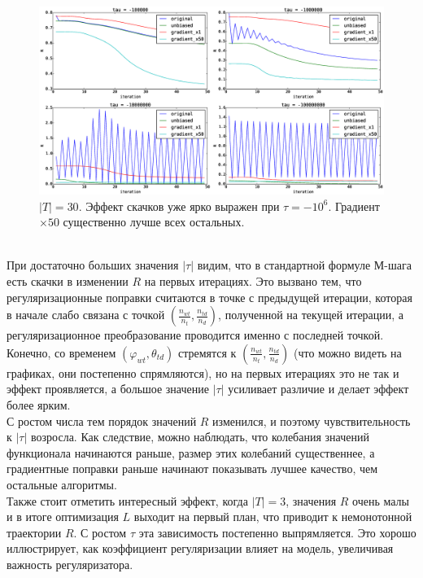 \documentclass[12pt]{article}
\renewcommand{\phi}{\varphi}
\begin{document}
\begin{figure}[H]
	\centering
	\caption{$|T| = 30$. Эффект скачков уже ярко выражен при $\tau = -10^6$. Градиент $\times 50$ существенно лучше всех остальных.}    
	\includegraphics[width=1.0\linewidth]{pictures/topics_30_R_values}
\end{figure}
\ \\
При достаточно больших значения $|\tau|$ видим, что в стандартной  формуле М-шага есть скачки в изменении $R$ на первых итерациях. Это вызвано тем, что регуляризационные поправки считаются в точке с предыдущей итерации, которая в начале слабо связана с точкой $\left( \frac{n_{wt}}{{n_t}}, \frac{n_{td}}{n_d}\right)$, полученной на текущей итерации, а регуляризационное преобразование проводится именно с последней точкой. Конечно, со временем $(\phi_{wt}, \theta_{td})$ стремятся к $\left( \frac{n_{wt}}{{n_t}}, \frac{n_{td}}{n_d}\right)$ (что можно видеть на графиках, они постепенно спрямляются), но на первых итерациях это не так и эффект проявляется, а большое значение $|\tau|$ усиливает различие и делает эффект более ярким.\\
С ростом числа тем порядок значений $R$ изменился, и поэтому чувствительность к $|\tau|$ возросла. Как следствие, можно наблюдать, что колебания значений функционала начинаются раньше, размер этих колебаний существеннее, а градиентные поправки раньше начинают показывать лучшее качество, чем остальные алгоритмы.\\
Также стоит отметить интересный эффект, когда $|T| = 3$, значения $R$ очень малы и в итоге оптимизация $L$ выходит на первый план, что приводит к немонотонной траектории $R$. С ростом $\tau$ эта зависимость постепенно выпрямляется. Это хорошо иллюстрирует, как коэффициент регуляризации влияет на модель, увеличивая важность регуляризатора.
\end{document}
